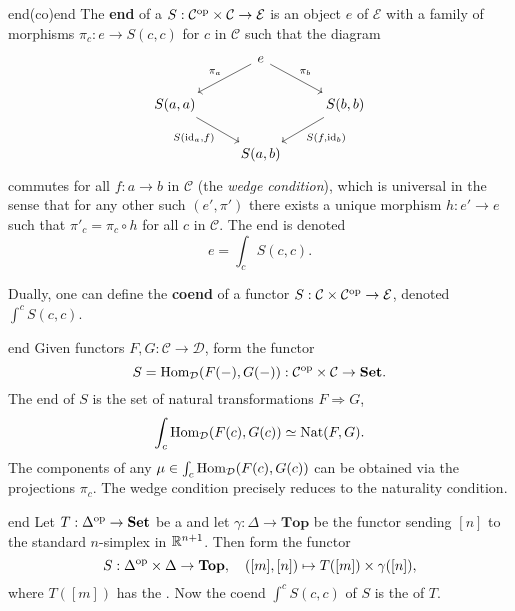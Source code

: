 \begin{topic}{end}{(co)end}
    The \textbf{end} of a  $S : \mathcal{C}^\textup{op} \times \mathcal{C} \to \mathcal{E}$ is an object $e$ of $\mathcal{E}$ with a family of morphisms $\pi_c : e \to S(c, c)$ for $c$ in $\mathcal{C}$ such that the diagram
    \[ \begin{tikzcd} & e \arrow[swap]{ld}{\pi_a} \arrow{dr}{\pi_b} & \\ S(a, a) \arrow[swap]{dr}{S(\id_a, f)} && S(b, b) \arrow{ld}{S(f, \id_b)} \\ & S(a, b) & \end{tikzcd} \]
    commutes for all $f : a \to b$ in $\mathcal{C}$ (the \textit{wedge condition}), which is universal in the sense that for any other such $(e', \pi')$ there exists a unique morphism $h : e' \to e$ such that $\pi'_c = \pi_c \circ h$ for all $c$ in $\mathcal{C}$. The end is denoted
    \[ e = \int_c S(c, c) . \]
    
    Dually, one can define the \textbf{coend} of a functor $S : \mathcal{C} \times \mathcal{C}^\textup{op} \to \mathcal{E}$, denoted $\int^c S(c, c)$.
\end{topic}

\begin{example}{end}
    Given functors $F, G : \mathcal{C} \to \mathcal{D}$, form the functor
    \[ S = \text{Hom}_\mathcal{D}(F(-), G(-)) : \mathcal{C}^\textup{op} \times \mathcal{C} \to \textbf{Set} . \]
    The end of $S$ is the set of natural transformations $F \Rightarrow G$,
    \[ \int_c \text{Hom}_\mathcal{D}(F(c), G(c)) \simeq \textup{Nat}(F, G) . \]
    The components of any $\mu \in \int_c \text{Hom}_\mathcal{D}(F(c), G(c))$ can be obtained via the projections $\pi_c$. The wedge condition precisely reduces to the naturality condition.
\end{example}

\begin{example}{end}
    Let $T : \Delta^\textup{op} \to \textbf{Set}$ be a  and let $\gamma : \Delta \to \textbf{Top}$ be the functor sending $[n]$ to the standard $n$-simplex in $\mathbb{R}^{n + 1}$. Then form the functor
    \[ S : \Delta^\textup{op} \times \Delta \to \textbf{Top}, \quad ([m], [n]) \mapsto T([m]) \times \gamma([n]) , \]
    where $T([m])$ has the . Now the coend $\int^c S(c, c)$ of $S$ is the  of $T$.
\end{example}

